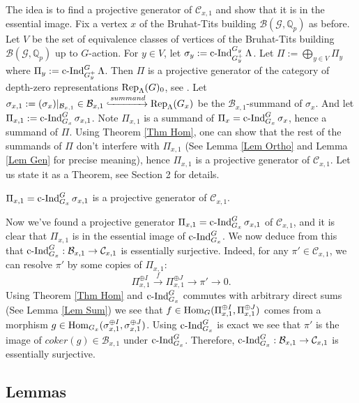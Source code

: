 	The idea is to find a projective generator of $\mathcal{C}_{x,1}$ and show that it is in the essential image. Fix a vertex $x$ of the Bruhat-Tits building $\mathcal{B}(\mathcal{G}, \mathbb{Q}_p)$ as before. Let $V$ be the set of equivalence classes of vertices of the Bruhat-Tits building $\mathcal{B}(\mathcal{G}, \mathbb{Q}_p)$ up to $G$-action. For $y \in V$, let $\sigma_y:=\operatorname{\operatorname{c-Ind}}_{G_y^+}^{G_y}\Lambda$. Let $\Pi:=\bigoplus_{y \in V}\Pi_y$ where $\Pi_y:=\operatorname{\operatorname{c-Ind}}_{G_y^+}^G\Lambda$. Then $\Pi$ is a projective generator of the category of depth-zero representations $\operatorname{\operatorname{Rep}}_{\Lambda}(G)_0$, see \cite[Appendix]{dat2009finitude}. Let $\sigma_{x,1}:=(\sigma_x)|_{\mathcal{B}_{x,1}} \in \mathcal{B}_{x,1} \xhookrightarrow{summand} \operatorname{\operatorname{Rep}}_{\Lambda}(G_x)$ be the $\mathcal{B}_{x,1}$-summand of $\sigma_x$. And let $\Pi_{x,1}:=\operatorname{\operatorname{c-Ind}}_{G_x}^G\sigma_{x,1}$. Note $\Pi_{x,1}$ is a summand of $\Pi_x=\operatorname{\operatorname{c-Ind}}_{G_x}^G\sigma_x$, hence a summand of $\Pi$. Using Theorem \ref{Thm Hom}, one can show that the rest of the summands of $\Pi$ don't interfere with $\Pi_{x,1}$ (See Lemma \ref{Lem Ortho} and Lemma \ref{Lem Gen} for precise meaning), hence $\Pi_{x,1}$ is a projective generator of $\mathcal{C}_{x,1}$. Let us state it as a Theorem, see Section 2 for details.
	
	\begin{theorem}\label{Thm Proj}
		$\Pi_{x,1}=\operatorname{\operatorname{c-Ind}}_{G_x}^G\sigma_{x,1}$ is a projective generator of $\mathcal{C}_{x,1}$.
	\end{theorem}
	
	Now we've found a projective generator $\Pi_{x,1}=\operatorname{\operatorname{c-Ind}}_{G_x}^G\sigma_{x,1}$ of $\mathcal{C}_{x,1}$, and it is clear that $\Pi_{x,1}$ is in the essential image of $\operatorname{\operatorname{c-Ind}}_{G_x}^G$. We now deduce from this that $\operatorname{\operatorname{c-Ind}}_{G_x}^G: \mathcal{B}_{x,1} \to \mathcal{C}_{x,1}$ is essentially surjective. Indeed, for any $\pi' \in \mathcal{C}_{x,1}$, we can resolve $\pi'$ by some copies of $\Pi_{x,1}$:
	$$\Pi_{x,1}^{\oplus I} \xrightarrow{f} \Pi_{x,1}^{\oplus J} \to \pi' \to 0.$$
	Using Theorem \ref{Thm Hom} and $\operatorname{\operatorname{c-Ind}}_{G_x}^G$ commutes with arbitrary direct sums (See Lemma \ref{Lem Sum}) we see that $f \in \operatorname{\operatorname{Hom}}_G(\Pi_{x,1}^{\oplus I}, \Pi_{x,1}^{\oplus J})$ comes from a morphism $g \in \operatorname{\operatorname{Hom}}_{G_x}(\sigma_{x,1}^{\oplus I}, \sigma_{x,1}^{\oplus J})$. Using $\operatorname{\operatorname{c-Ind}}_{G_x}^G$ is exact we see that $\pi'$ is the image of $coker(g) \in \mathcal{B}_{x,1}$ under $\operatorname{\operatorname{c-Ind}}_{G_x}^G$. Therefore, $\operatorname{\operatorname{c-Ind}}_{G_x}^G: \mathcal{B}_{x,1} \to \mathcal{C}_{x,1}$ is essentially surjective.
	
	\subsection{Lemmas}
	
